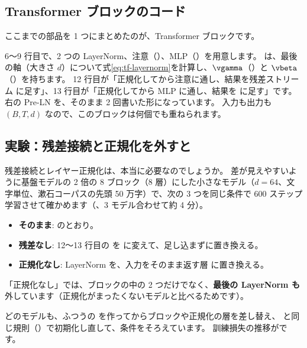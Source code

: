 \subsection*{Transformer ブロックのコード}

ここまでの部品を 1 つにまとめたのが、Transformer ブロックです。


6〜9 行目で、2 つの LayerNorm、注意（）、MLP（）を用意します。
 は、最後の軸（大きさ $d$）について式\eqref{eq:tf-layernorm}を計算し、$\vgamma$（）と $\vbeta$（）を持ちます。
12 行目が「正規化してから注意に通し、結果を残差ストリーム  に足す」、13 行目が「正規化してから MLP に通し、結果を  に足す」です。
右の Pre-LN を、そのまま 2 回書いた形になっています。
入力も出力も $(B,T,d)$ なので、このブロックは何個でも重ねられます。

\subsection*{実験：残差接続と正規化を外すと}

残差接続とレイヤー正規化は、本当に必要なのでしょうか。
差が見えやすいように基盤モデルの 2 倍の 8 ブロック（8 層）にした小さなモデル（$d=64$、文字単位、漱石コーパスの先頭 50 万字）で、次の 3 つを同じ条件で 600 ステップ学習させて確かめます（、3 モデル合わせて約 4 分）。
\begin{itemize}
\item \textbf{そのまま}: のとおり。
\item \textbf{残差なし}: 12〜13 行目の  を  に変えて、足し込まずに置き換える。
\item \textbf{正規化なし}: LayerNorm を、入力をそのまま返す層  に置き換える。
\end{itemize}
「正規化なし」では、ブロックの中の 2 つだけでなく、\textbf{最後の LayerNorm も}外しています（正規化がまったくないモデルと比べるためです）。

どのモデルも、ふつうの  を作ってからブロックや正規化の層を差し替え、 と同じ規則（）で初期化し直して、条件をそろえています。
訓練損失の推移がです。


